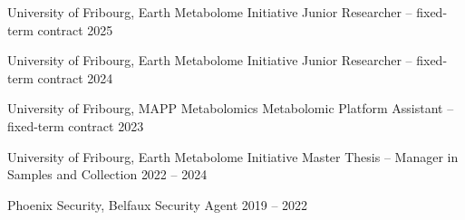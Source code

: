 

\begin{cventries}


\cventrynoloc
  {University of Fribourg, Earth Metabolome Initiative} %
  {Junior Researcher – fixed-term contract} %
  {2025} %
  {}

\cventrynoloc
  {University of Fribourg, Earth Metabolome Initiative} %
  {Junior Researcher – fixed-term contract} %
  {2024} %
  {}

\cventrynoloc
  {University of Fribourg, MAPP Metabolomics} %
  {Metabolomic Platform Assistant – fixed-term contract} %
  {2023} %
  {}

\cventrynoloc
  {University of Fribourg, Earth Metabolome Initiative} %
  {Master Thesis – Manager in Samples and Collection} %
  {2022 -- 2024} %
  {}

\cventrynoloc
  {Phoenix Security, Belfaux} %
  {Security Agent} %
  {2019 -- 2022} %
  {}

\end{cventries}
